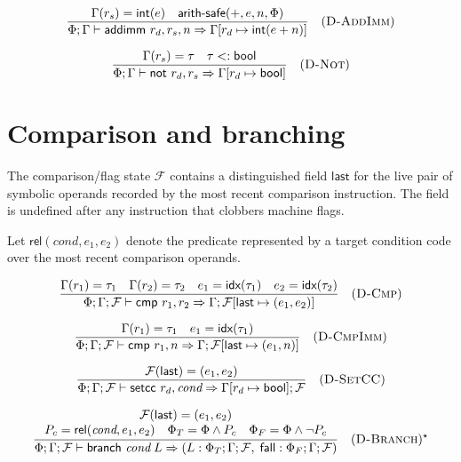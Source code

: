 $$
  \frac{
    \Gamma(r_s) = \textsf{int}(e) \quad \textsf{arith-safe}(+,e,n,\Phi)
  }{\Phi; \Gamma \vdash \textsf{addimm } r_d, r_s, n \Rightarrow \Gamma[r_d \mapsto \textsf{int}(e + n)]} \quad (\textsc{D-AddImm})
$$

$$
  \frac{
    \Gamma(r_s) = \tau \quad \tau <: \textsf{bool}
  }{\Phi; \Gamma \vdash \textsf{not } r_d, r_s \Rightarrow \Gamma[r_d \mapsto \textsf{bool}]} \quad (\textsc{D-Not})
$$

\section*{Comparison and branching}

\noindent The comparison/flag state $\mathcal{F}$ contains a distinguished field $\textsf{last}$ for the live pair of symbolic operands recorded by the most recent comparison instruction. The field is undefined after any instruction that clobbers machine flags.

\noindent Let $\mathsf{rel}(\textit{cond}, e_1, e_2)$ denote the predicate represented by a target condition code over the most recent comparison operands.

$$
  \frac{
    \Gamma(r_1) = \tau_1 \quad \Gamma(r_2) = \tau_2 \quad e_1=\textsf{idx}(\tau_1) \quad e_2=\textsf{idx}(\tau_2)
  }{\Phi; \Gamma; \mathcal{F} \vdash \textsf{cmp } r_1, r_2 \Rightarrow \Gamma; \mathcal{F}[\textsf{last} \mapsto (e_1,e_2)]} \quad (\textsc{D-Cmp})
$$

$$
  \frac{
    \Gamma(r_1) = \tau_1 \quad e_1=\textsf{idx}(\tau_1)
  }{\Phi; \Gamma; \mathcal{F} \vdash \textsf{cmp } r_1, n \Rightarrow \Gamma; \mathcal{F}[\textsf{last} \mapsto (e_1,n)]} \quad (\textsc{D-CmpImm})
$$

$$
  \frac{
    \mathcal{F}(\textsf{last}) = (e_1,e_2)
  }{\Phi; \Gamma; \mathcal{F} \vdash \textsf{setcc } r_d, \textit{cond} \Rightarrow \Gamma[r_d \mapsto \textsf{bool}]; \mathcal{F}} \quad (\textsc{D-SetCC})
$$

$$
  \frac{
    \begin{array}{c}
      \mathcal{F}(\textsf{last}) = (e_1,e_2) \\
      P_c = \mathsf{rel}(\textit{cond}, e_1, e_2) \quad
      \Phi_T = \Phi \wedge P_c \quad
      \Phi_F = \Phi \wedge \neg P_c
    \end{array}
  }{
    \Phi; \Gamma; \mathcal{F} \vdash \textsf{branch } \textit{cond}\; L
    \Rightarrow
    (L: \Phi_T; \Gamma; \mathcal{F},\; \mathsf{fall}: \Phi_F; \Gamma; \mathcal{F})
  } \quad (\textsc{D-Branch})^\star
$$

